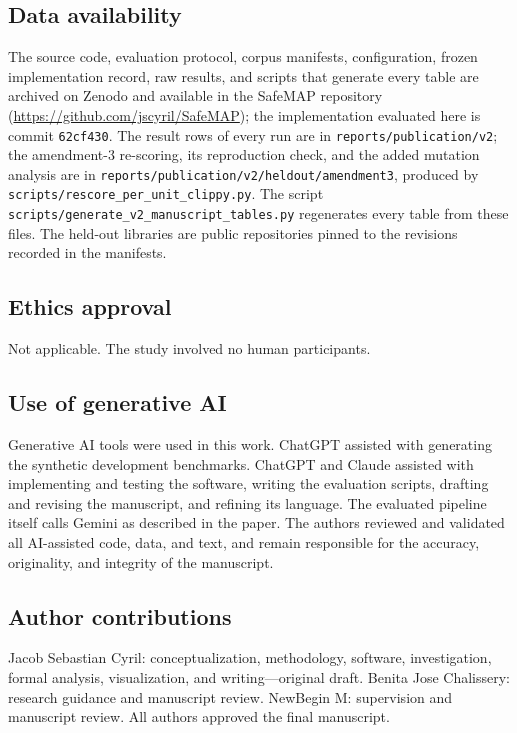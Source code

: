 \documentclass[pdflatex,sn-basic]{sn-jnl}
\begin{document}
\subsection*{Data availability}
The source code, evaluation protocol, corpus manifests, configuration, frozen
implementation record, raw results, and scripts that generate every table are
archived on Zenodo \citep{cyril2026safemapdata} and
available in the SafeMAP repository
(\url{https://github.com/jscyril/SafeMAP}); the implementation evaluated here
is commit \texttt{62cf430}. The result rows of every run are in
\texttt{reports/publication/v2}; the amendment-3 re-scoring, its
reproduction check, and the added mutation analysis are in
\texttt{reports/publication/v2/heldout/amendment3}, produced by
\texttt{scripts/rescore\_per\_unit\_clippy.py}. The script
\texttt{scripts/generate\_v2\_manuscript\_tables.py} regenerates every table
from these files. The held-out libraries are public repositories
pinned to the revisions recorded in the manifests.

\subsection*{Ethics approval}
Not applicable. The study involved no human participants.

\subsection*{Use of generative AI}
Generative AI tools were used in this work. ChatGPT assisted with generating
the synthetic development benchmarks. ChatGPT and Claude assisted with
implementing and testing the software, writing the evaluation scripts,
drafting and revising the manuscript, and refining its language. The evaluated pipeline
itself calls Gemini as described in the paper. The authors reviewed and
validated all AI-assisted code, data, and text, and remain responsible for the
accuracy, originality, and integrity of the manuscript.

\subsection*{Author contributions}
Jacob Sebastian Cyril: conceptualization, methodology, software,
investigation, formal analysis, visualization, and writing---original draft.
Benita Jose Chalissery: research guidance and manuscript review. NewBegin M:
supervision and manuscript review. All authors approved the final manuscript.

{\def\bibfont{\footnotesize}}
\end{document}
